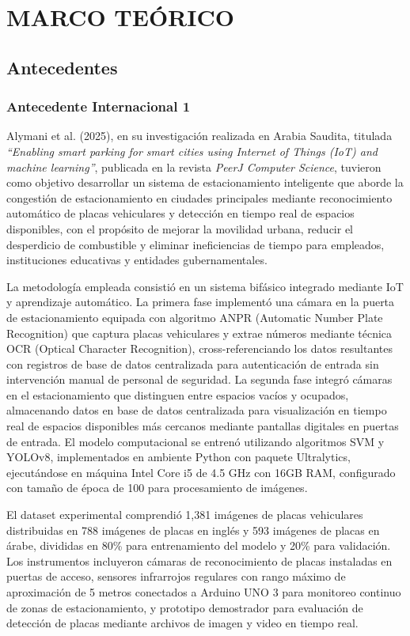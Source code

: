 \documentclass[12pt,a4paper]{article}
\begin{document}
\clearpage
\section{MARCO TEÓRICO}

\subsection{Antecedentes}

\subsubsection{Antecedente Internacional 1}

Alymani et al. (2025), en su investigación realizada en Arabia Saudita, titulada \textit{``Enabling smart parking for smart cities using Internet of Things (IoT) and machine learning''}, publicada en la revista \textit{PeerJ Computer Science}, tuvieron como objetivo desarrollar un sistema de estacionamiento inteligente que aborde la congestión de estacionamiento en ciudades principales mediante reconocimiento automático de placas vehiculares y detección en tiempo real de espacios disponibles, con el propósito de mejorar la movilidad urbana, reducir el desperdicio de combustible y eliminar ineficiencias de tiempo para empleados, instituciones educativas y entidades gubernamentales.

La metodología empleada consistió en un sistema bifásico integrado mediante IoT y aprendizaje automático. La primera fase implementó una cámara en la puerta de estacionamiento equipada con algoritmo ANPR (Automatic Number Plate Recognition) que captura placas vehiculares y extrae números mediante técnica OCR (Optical Character Recognition), cross-referenciando los datos resultantes con registros de base de datos centralizada para autenticación de entrada sin intervención manual de personal de seguridad. La segunda fase integró cámaras en el estacionamiento que distinguen entre espacios vacíos y ocupados, almacenando datos en base de datos centralizada para visualización en tiempo real de espacios disponibles más cercanos mediante pantallas digitales en puertas de entrada. El modelo computacional se entrenó utilizando algoritmos SVM y YOLOv8, implementados en ambiente Python con paquete Ultralytics, ejecutándose en máquina Intel Core i5 de 4.5 GHz con 16GB RAM, configurado con tamaño de época de 100 para procesamiento de imágenes.

El dataset experimental comprendió 1,381 imágenes de placas vehiculares distribuidas en 788 imágenes de placas en inglés y 593 imágenes de placas en árabe, divididas en 80\% para entrenamiento del modelo y 20\% para validación. Los instrumentos incluyeron cámaras de reconocimiento de placas instaladas en puertas de acceso, sensores infrarrojos regulares con rango máximo de aproximación de 5 metros conectados a Arduino UNO 3 para monitoreo continuo de zonas de estacionamiento, y prototipo demostrador para evaluación de detección de placas mediante archivos de imagen y video en tiempo real.
\end{document}
